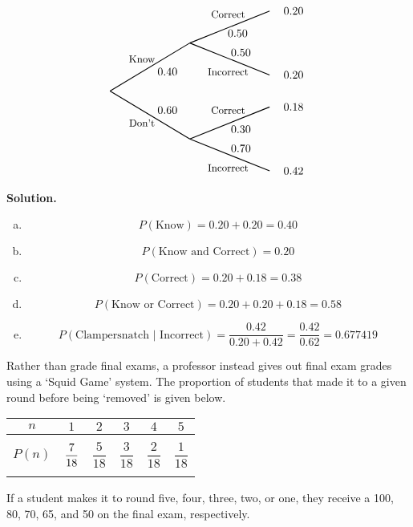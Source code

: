 \documentclass[12pt,letterpaper]{exam}
\begin{document}
\begin{questions}
\[\begin{tikzpicture}[scale= 1.0]
	\node at (1,1) {\FirstUpLabel};	
	\node at (1,-1) {\FirstDownLabel};	
	\node at (1.8,0.6) {\Up};
	\node at (1.8,-0.6) {\Down};
	\draw[thick] (0,0) -- (2.5,1.5);
	\draw[thick] (0,0) -- (2.5,-1.5);
	
	\node at (3.7,2.4) {\SecondUpLabel};
	\node at (3.7,0.6) {\SecondDownLabel};
	\node at (4,1.8) {\UpUp};
	\node at (4.1,1.2) {\UpDown};
	\node at (5.75,2.5) {\first};
	\node at (5.75,0.5) {\second};
	\draw[thick] (2.5,1.5) -- (5,2.5);
	\draw[thick] (2.5,1.5) -- (5,0.5);
	
	\node at (3.7,-0.6) {\SecondUpLabel};
	\node at (3.7,-2.4) {\SecondDownLabel};
	\node at (4.1,-1.2) {\DownUp};
	\node at (4.1,-1.8) {\DownDown};
	\node at (5.75,-0.5) {\third};	
	\node at (5.75,-2.5) {\fourth};	
	\draw[thick] (2.5,-1.5) -- (5,-0.5);
	\draw[thick] (2.5,-1.5) -- (5,-2.5);
	\end{tikzpicture}
	\]

{\noindent\bfseries Solution.}

\begin{enumerate}[(a)]
\item 
	\[
	P(\text{Know})= 0.20 + 0.20= 0.40 
	\] \vfill

\item 
	\[
	P(\text{Know and Correct})= 0.20
	\] \vfill

\item 
	\[
	P(\text{Correct})= 0.20 + 0.18= 0.38 
	\] \vfill

\item 
	\[
	P(\text{Know or Correct})= 0.20 + 0.20 + 0.18= 0.58 
	\] \vfill

\item 
	\[
	P(\text{Clampersnatch | Incorrect})= \dfrac{0.42}{0.20 + 0.42}= \dfrac{0.42}{0.62}= 0.677419
	\] \vfill
\end{enumerate}





\newpage
\question Rather than grade final exams, a professor instead gives out final exam grades using a `Squid Game' system. The proportion of students that made it to a given round before being `removed' is given below. 
	\begin{table}[!ht]
	\centering 
	\begin{tabular}{|c||c|c|c|c|c|} \hline 
	$n$ & $1$ & $2$ & $3$ & $4$ & $5$ \\ \hline 
	$P(n)$ & $\dfrac{7\rule{0pt}{2.9ex}}{18\rule[-1.3ex]{0pt}{0pt}}$ & $\dfrac{5}{18}$ & $\dfrac{3}{18}$ & $\dfrac{2}{18}$ & $\mathit{\dfrac{1}{18}}$ \\ \hline 
	\end{tabular}
	\end{table} \par
If a student makes it to round five, four, three, two, or one, they receive a 100, 80, 70, 65, and 50 on the final exam, respectively. 


\end{questions}
\end{document}
